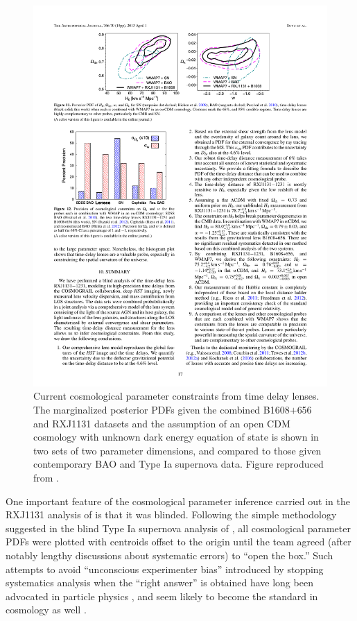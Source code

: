 \begin{figure}[!ht]
\centering\includegraphics[width=0.9\linewidth]{figures/Suyu13_fig11.pdf}
\caption{Current cosmological parameter constraints from time delay
lenses. The marginalized posterior PDFs given the combined B1608$+$656
and RXJ1131 datasets and the assumption of an open CDM cosmology with
unknown dark energy equation of state is shown in
two sets of two parameter dimensions,
and compared to those given contemporary BAO and Type Ia supernova data.
Figure reproduced from \citet{Suy++14}.}
\label{fig:current-constraints}
\end{figure}

One important feature of the cosmological parameter inference carried
out in the RXJ1131 analysis of \citet{Suy++13} is that it was blinded.
Following the simple methodology suggested in the blind Type Ia
supernova analysis of \citet{Con++06}, all cosmological parameter PDFs
were plotted with centroids offset to the origin until the team agreed
(after notably lengthy discussions about systematic errors) to ``open
the box.'' Such attempts to avoid ``unconscious experimenter bias''
introduced by stopping systematics analysis when the ``right answer'' is
obtained have long been advocated in particle physics
\citep{klein2005blind}, and seem likely to become the standard in
cosmology as well \citep[e.g.][]{STEP,DESWL}.

